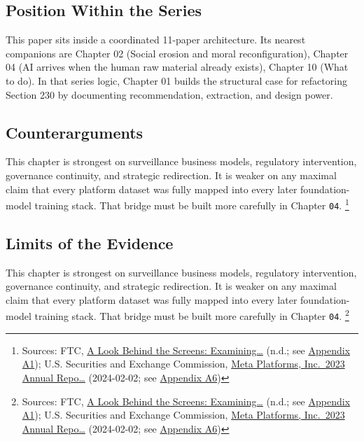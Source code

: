 \documentclass[
  american,
  11pt,
  letterpaper,
]{article}
\begin{document}
\subsection{Position Within the
Series}\label{position-within-the-series-1}

This paper sits inside a coordinated 11-paper architecture. Its nearest
companions are Chapter 02 (Social erosion and moral reconfiguration),
Chapter 04 (AI arrives when the human raw material already exists),
Chapter 10 (What to do). In that series logic, Chapter 01 builds the
structural case for refactoring Section 230 by documenting
recommendation, extraction, and design power.

\subsection{Counterarguments}\label{counterarguments-1}

This chapter is strongest on surveillance business models, regulatory
intervention, governance continuity, and strategic redirection. It is
weaker on any maximal claim that every platform dataset was fully mapped
into every later foundation-model training stack. That bridge must be
built more carefully in Chapter \texttt{04}. \footnote{Sources: FTC,
  \href{https://www.ftc.gov/reports/look-behind-screens-examining-data-practices-social-media-video-streaming-services}{A
  Look Behind the Screens: Examining\ldots{}} (n.d.; see
  \hyperref[ch-01-appendix-a1-a-look-behind-the-screens-examining-the-data-practices-of-social-media-and-video-streaming-services]{Appendix
  A1}); U.S. Securities and Exchange Commission,
  \href{https://www.sec.gov/Archives/edgar/data/1326801/000132680124000012/meta-20231231.htm}{Meta
  Platforms, Inc.~2023 Annual Repo\ldots{}} (2024-02-02; see
  \hyperref[ch-01-appendix-a6-meta-platforms-inc-2023-annual-report-form-10-k]{Appendix
  A6})}

\subsection{Limits of the Evidence}\label{limits-of-the-evidence-1}

This chapter is strongest on surveillance business models, regulatory
intervention, governance continuity, and strategic redirection. It is
weaker on any maximal claim that every platform dataset was fully mapped
into every later foundation-model training stack. That bridge must be
built more carefully in Chapter \texttt{04}. \footnote{Sources: FTC,
  \href{https://www.ftc.gov/reports/look-behind-screens-examining-data-practices-social-media-video-streaming-services}{A
  Look Behind the Screens: Examining\ldots{}} (n.d.; see
  \hyperref[ch-01-appendix-a1-a-look-behind-the-screens-examining-the-data-practices-of-social-media-and-video-streaming-services]{Appendix
  A1}); U.S. Securities and Exchange Commission,
  \href{https://www.sec.gov/Archives/edgar/data/1326801/000132680124000012/meta-20231231.htm}{Meta
  Platforms, Inc.~2023 Annual Repo\ldots{}} (2024-02-02; see
  \hyperref[ch-01-appendix-a6-meta-platforms-inc-2023-annual-report-form-10-k]{Appendix
  A6})}
\end{document}
